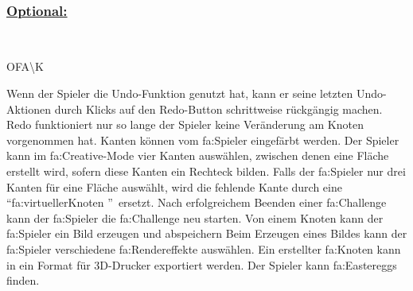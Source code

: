 ~\\


%
%
\subsubsection*{\underline{Optional:}}~\\


\begin{ids}{\gls{OFA\K}}

	\id[ 190] Wenn der Spieler die \gls{Undo}-Funktion genutzt hat, kann er seine letzten \gls{Undo}-Aktionen durch Klicks auf den \gls{Redo}-Button schrittweise rückgängig machen. \gls{Redo} funktioniert nur so lange der Spieler keine Veränderung am Knoten vorgenommen hat.
 	\id[ 200] Kanten können vom \gls{fa:Spieler} eingefärbt werden.
 	\id[ 210] Der Spieler kann im \gls{fa:Creative}-Mode vier Kanten auswählen, zwischen denen eine Fläche erstellt wird, sofern diese Kanten ein Rechteck bilden.
 	\id[ 220] Falls der \gls{fa:Spieler} nur drei Kanten für eine Fläche auswählt, wird  die fehlende Kante durch eine \textquotedblleft \gls{fa:virtuellerKnoten} \textquotedblright~ersetzt.
 	\id [230] Nach erfolgreichem Beenden einer \gls{fa:Challenge} kann der \gls{fa:Spieler} die \gls{fa:Challenge} neu starten.
 	\id[ 240] Von einem Knoten kann der \gls{fa:Spieler} ein Bild erzeugen und abspeichern
 	\id[ 250] Beim Erzeugen eines Bildes kann der \gls{fa:Spieler} verschiedene \gls{fa:Rendereffekte} auswählen.
 	\id[ 260] Ein erstellter \gls{fa:Knoten} kann in ein Format für 3D-Drucker exportiert werden.
 	\id[ 270] Der Spieler kann \gls{fa:Easteregg}s finden.
 	
	
\end{ids}

~\\